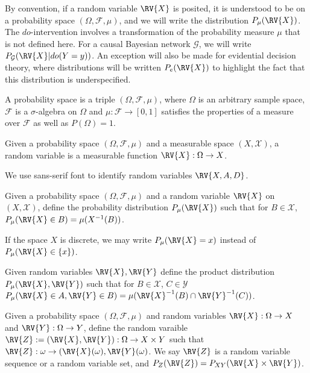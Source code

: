 By convention, if a random variable $\RV{X}$ is posited, it is understood to be on a probability space $(\Omega,\mathcal{F},\mu)$, and we will write the distribution $P_\mu(\RV{X})$. The $do$-intervention involves a transformation of the probability measure $\mu$ that is not defined here. For a causal Bayesian network $\mathcal{G}$, we will write $P_{\mathcal{G}}(\RV{X}|do(Y=y))$. An exception will also be made for evidential decision theory, where distributions will be written $P_e(\RV{X})$ to highlight the fact that this distribution is underspecified.

\begin{definition}
A probability space is a triple $(\Omega,\mathcal{F},\mu)$, where $\Omega$ is an arbitrary sample space, $\mathcal{F}$ is a $\sigma$-algebra on $\Omega$ and $\mu:\mathcal{F}\to[0,1]$ satisfies the properties of a measure over $\mathcal{F}$ as well as $P(\Omega)=1$.
\end{definition}

\begin{definition}\label{def:random_variable}
Given a probability space $(\Omega,\mathcal{F},\mu)$ and a measurable space $(X,\mathcal{X})$, a random variable is a measurable function $\RV{X}:\Omega\to X$.

We use sans-serif font to identify random variables $\RV{X,A,D}$.
\end{definition}

\begin{definition}
Given a probability space $(\Omega,\mathcal{F},\mu)$ and a random variable $\RV{X}$ on $(X,\mathcal{X})$, define the probability distribution $P_\mu(\RV{X})$ such that for $B\in \mathcal{X}$, $P_\mu(\RV{X}\in B)=\mu(X^{-1}(B))$.

If the space $X$ is discrete, we may write $P_\mu(\RV{X}=x)$ instead of $P_\mu(\RV{X}\in\{x\})$.

Given random variables $\RV{X},\RV{Y}$ define the product distribution $P_\mu(\RV{X},\RV{Y})$ such that for $B\in\mathcal{X}$, $C\in\mathcal{Y}$ $P_\mu(\RV{X}\in A,\RV{Y}\in B)=\mu(\RV{X}^{-1}(B)\cap \RV{Y}^{-1}(C))$.
\end{definition}

\begin{definition}
Given a probability space $(\Omega,\mathcal{F},\mu)$ and random variables $\RV{X}:\Omega\to X$ and $\RV{Y}:\Omega\to Y$, define the random varaible $\RV{Z}:=(\RV{X},\RV{Y}):\Omega\to X\times Y$  such that $\RV{Z}:\omega\to (\RV{X}(\omega),\RV{Y}(\omega)$. We say $\RV{Z}$ is a random variable sequence or a random variable set, and $P_Z(\RV{Z})=P_{XY}(\RV{X}\times\RV{Y})$.
\end{definition}

